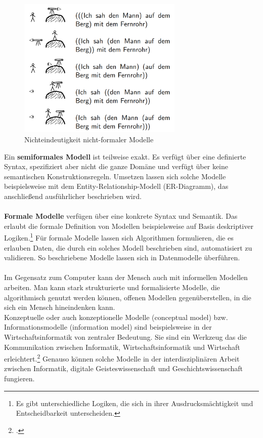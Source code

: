 \documentclass[12pt,a4paper]{article}
\begin{document}
\begin{figure}[H]
\centering
	\includegraphics[width=0.7\textwidth]{img/fernrohr.png}  
    \caption[Nichteindeutigkeit nicht-formaler Modelle, KÖNIG Bettina: Vorlesung ''Modellierungsmethoden der Informatik'', \protect\url{http://www.ti.inf.uni-due.de/fileadmin/public/teaching/mod/slides/ws201112/einfuehrung.pdf}, 10.06.2019]{Nichteindeutigkeit nicht-formaler Modelle}\label{fig:fernrohr}
\end{figure} 
Ein \textbf{semiformales Modell} ist teilweise exakt. Es verfügt über eine definierte Syntax, spezifiziert aber nicht die ganze Domäne und verfügt über keine semantischen Konstruktionsregeln. Umsetzen lassen sich solche Modelle beispielsweise mit dem Entity-Relationship-Modell (ER-Diagramm), das anschließend ausführlicher beschrieben wird.
\\
\\
\textbf{Formale Modelle} verfügen über eine konkrete Syntax und Semantik. Das erlaubt die formale Definition von Modellen beispielsweise auf Basis deskriptiver Logiken.\footnote{Es gibt unterschiedliche Logiken, die sich in ihrer Ausdrucksmächtigkeit und Entscheidbarkeit unterscheiden.} Für formale Modelle lassen sich Algorithmen formulieren, die es erlauben Daten, die durch ein solches Modell beschrieben sind, automatisiert zu validieren. So beschriebene Modelle lassen sich in Datenmodelle überführen.
\\
\\
Im Gegensatz zum Computer kann der Mensch auch mit informellen Modellen arbeiten. Man kann stark strukturierte und formalisierte Modelle, die algorithmisch genutzt werden können, offenen Modellen gegenüberstellen, in die sich ein Mensch hineindenken kann.
\\
Konzeptuelle oder auch konzeptionelle Modelle (conceptual model) bzw. Informationsmodelle (information model) sind beispielsweise in der Wirtschaftsinformatik von zentraler Bedeutung. Sie sind ein Werkzeug das die Kommunikation zwischen Informatik, Wirtschaftsinformatik und Wirtschaft erleichtert.\footcite[][S.44-47]{kobler2010qualitat} Genauso können solche Modelle in der interdisziplinären Arbeit zwischen Informatik, digitale Geisteswissenschaft und Geschichtswissenschaft fungieren.
\end{document}
